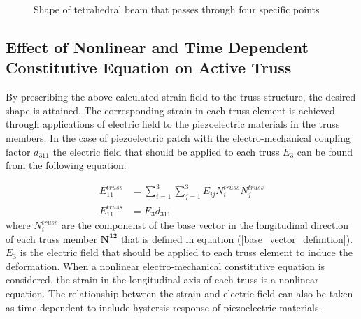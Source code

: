 \begin{figure}
\centering
{}
\caption{Shape of tetrahedral beam that passes through four specific points}
\label{fig:tetra_hedral_three_point}
\end{figure}

\subsection{Effect of Nonlinear and Time Dependent Constitutive Equation on Active Truss}
By prescribing the above calculated strain field to the truss structure, the desired shape is attained. The corresponding strain in each truss element is achieved through applications of electric field to the piezoelectric materials in the truss members.
In the case of piezoelectric patch with the electro-mechanical coupling factor $d_{311}$ the electric field that should be applied to each truss $E_3$ can be found from the following equation:

\begin{equation}
\begin{aligned}
E_{11}^{truss} &=\sum_{i=1}^3 \sum_{j=1}^3 E_{ij}N^{truss}_i N^{truss}_j\\
E_{11}^{truss} &=E_3 d_{311} 
\end{aligned}
\label{electric_field_in_each_truss:eqn}
\end{equation}
where 
$N^{truss}_{i}$ are the componenst of the base vector in the longitudinal direction of each truss member $\mathbf {N^{12}}$ that is defined in equation (\ref{base_vector_definition}).
$E_3$ is the electric field that should be applied to each truss element to induce the deformation.
When a nonlinear electro-mechanical constitutive equation is considered, the strain in the longitudinal axis of each truss is a nonlinear equation.
The relationship between the strain and electric field can also be taken as time dependent to include hystersis response of piezoelectric materials.

